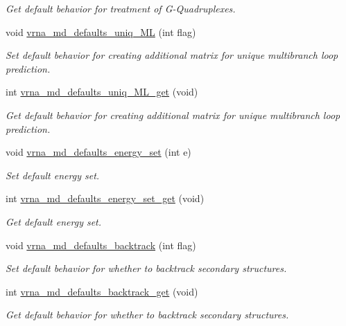 \begin{DoxyCompactItemize}
\begin{DoxyCompactList}\small\item\em Get default behavior for treatment of G-\/\+Quadruplexes. \end{DoxyCompactList}\item 
void \hyperlink{group__model__details_ga59b944f61c5d2babec2d4c48c820de67}{vrna\+\_\+md\+\_\+defaults\+\_\+uniq\+\_\+\+M\+L} (int flag)
\begin{DoxyCompactList}\small\item\em Set default behavior for creating additional matrix for unique multibranch loop prediction. \end{DoxyCompactList}\item 
int \hyperlink{group__model__details_gab48e70fd024bf838404bcbcca0c874a0}{vrna\+\_\+md\+\_\+defaults\+\_\+uniq\+\_\+\+M\+L\+\_\+get} (void)
\begin{DoxyCompactList}\small\item\em Get default behavior for creating additional matrix for unique multibranch loop prediction. \end{DoxyCompactList}\item 
void \hyperlink{group__model__details_ga8dd29c55787a4576277e1907e92d810c}{vrna\+\_\+md\+\_\+defaults\+\_\+energy\+\_\+set} (int e)
\begin{DoxyCompactList}\small\item\em Set default energy set. \end{DoxyCompactList}\item 
int \hyperlink{group__model__details_ga017ed6afb1cba2b7f242412cab618b53}{vrna\+\_\+md\+\_\+defaults\+\_\+energy\+\_\+set\+\_\+get} (void)
\begin{DoxyCompactList}\small\item\em Get default energy set. \end{DoxyCompactList}\item 
void \hyperlink{group__model__details_ga978c468b2fe96a70d5191e3dd17d5599}{vrna\+\_\+md\+\_\+defaults\+\_\+backtrack} (int flag)
\begin{DoxyCompactList}\small\item\em Set default behavior for whether to backtrack secondary structures. \end{DoxyCompactList}\item 
int \hyperlink{group__model__details_ga90da1156e6883ddd68527c2830706648}{vrna\+\_\+md\+\_\+defaults\+\_\+backtrack\+\_\+get} (void)
\begin{DoxyCompactList}\small\item\em Get default behavior for whether to backtrack secondary structures. \end{DoxyCompactList}\item 

\end{DoxyCompactItemize}
